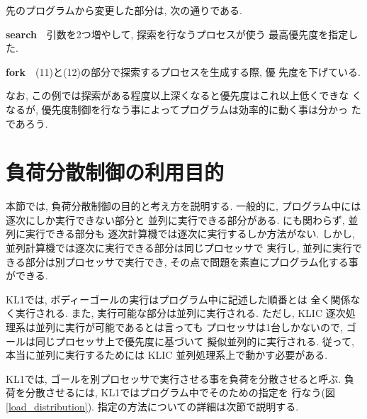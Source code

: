 \documentclass[a4,titlepage]{jsreport}
\begin{document}
先のプログラムから変更した部分は, 次の通りである.
\begin{description}
\item {\bf search}\ \ 引数を2つ増やして, 探索を行なうプロセスが使う
最高優先度を指定した.
\item {\bf fork}\ \ (11)と(12)の部分で探索するプロセスを生成する際, 優
先度を下げている.  
\end{description}

なお, この例では探索がある程度以上深くなると優先度はこれ以上低くできな
くなるが, 優先度制御を行なう事によってプログラムは効率的に動く事は分かっ
たであろう.

\section{負荷分散制御の利用目的}

本節では, 負荷分散制御の目的と考え方を説明する.  
一般的に, プログラム中には逐次にしか実行できない部分と
並列に実行できる部分がある.  にも関わらず, 並列に実行できる部分も
逐次計算機では逐次に実行するしか方法がない.  しかし, 
並列計算機では逐次に実行できる部分は同じプロセッサで
実行し, 並列に実行できる部分は別プロセッサで実行でき, 
その点で問題を素直にプログラム化する事ができる.  

KL1では, ボディーゴールの実行はプログラム中に記述した順番とは
全く関係なく実行される.  また, 実行可能な部分は並列に実行される.  
ただし, KLIC 逐次処理系は並列に実行が可能であるとは言っても
プロセッサは1台しかないので, ゴールは同じプロセッサ上で優先度に基づいて
擬似並列的に実行される.  従って, 本当に並列に実行するためには
KLIC 並列処理系上で動かす必要がある.

KL1では, ゴールを別プロセッサで実行させる事を負荷を分散させると呼ぶ.  
負荷を分散させるには, KL1ではプログラム中でそのための指定を
行なう(図\ref{load_distribution}).  
指定の方法についての詳細は次節で説明する.  
\end{document}
